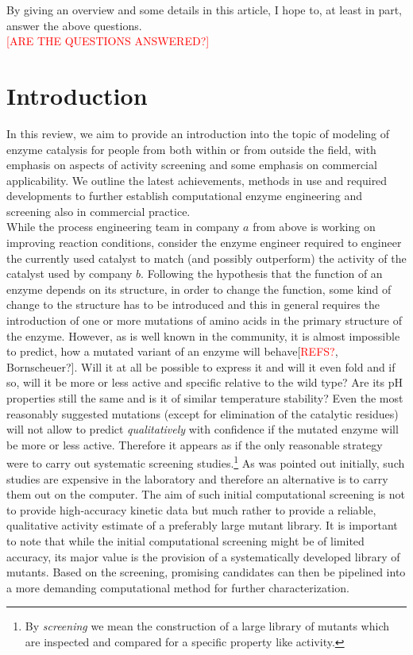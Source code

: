 By giving an overview and some details in this article, I hope to, at least in part, answer the above questions.\\
\textcolor{red}{[ARE THE QUESTIONS ANSWERED?]}


\clearpage
\section{Introduction}\label{sec:intro}
In this review, we aim to provide an introduction into the topic of modeling of enzyme catalysis for people from both within or from outside the field, with emphasis on aspects of activity screening and some emphasis on commercial applicability.
We outline the latest achievements, methods in use and required developments to further establish computational enzyme engineering and screening also in commercial practice.\\
While the process engineering team in company $a$ from above is working on improving reaction conditions, consider the enzyme engineer required to engineer the currently used catalyst to match (and possibly outperform) the activity of the catalyst used by company $b$.
Following the hypothesis that the function of an enzyme depends on its structure, in order to change the function, some kind of change to the structure has to be introduced and this in general requires the introduction of one or more mutations of amino acids in the primary structure of the enzyme.
However, as is well known in the community, it is almost impossible to predict, how a mutated variant of an enzyme will behave[\textcolor{red}{REFS?}, Bornscheuer?].
Will it at all be possible to express it and will it even fold and if so, will it be more or less active and specific relative to the wild type?
Are its pH properties still the same and is it of similar temperature stability?
Even the most reasonably suggested mutations (except for elimination of the catalytic residues) will not allow to predict \textit{qualitatively} with confidence if the mutated enzyme will be more or less active.
Therefore it appears as if the only reasonable strategy were to carry out systematic screening studies.\footnote{By \textit{screening} we mean the construction of a large library of mutants which are inspected and compared for a specific property like activity.}
As was pointed out initially, such studies are expensive in the laboratory and therefore an alternative is to carry them out on the computer.
The aim of such initial computational screening is not to provide high-accuracy kinetic data but much rather to provide a reliable, qualitative activity estimate of a preferably large mutant library.
It is important to note that while the initial computational screening might be of limited accuracy, its major value is the provision of a systematically developed library of mutants.
Based on the screening, promising candidates can then be pipelined into a more demanding computational method for further characterization.

